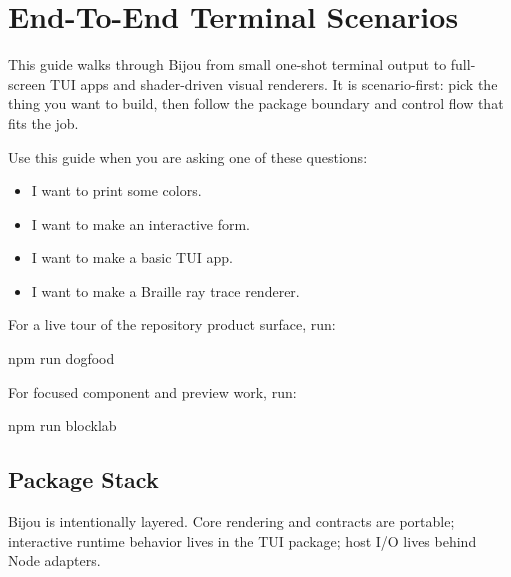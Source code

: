 \chapter{End-To-End Terminal Scenarios}\label{record-015}

\smallskip

This guide walks through Bijou from small one-shot terminal output to full-screen TUI apps and shader-driven visual renderers. It is scenario-first: pick the thing you want to build, then follow the package boundary and control flow that fits the job.

Use this guide when you are asking one of these questions:

\begin{itemize}
\tightlist
\item
  I want to print some colors.
\item
  I want to make an interactive form.
\item
  I want to make a basic TUI app.
\item
  I want to make a Braille ray trace renderer.
\end{itemize}

For a live tour of the repository product surface, run:

\begin{CodeBlock}
npm run dogfood
\end{CodeBlock}

For focused component and preview work, run:

\begin{CodeBlock}
npm run blocklab
\end{CodeBlock}

\section{Package Stack}\label{record-015-package-stack}

Bijou is intentionally layered. Core rendering and contracts are portable; interactive runtime behavior lives in the TUI package; host I/O lives behind Node adapters.

